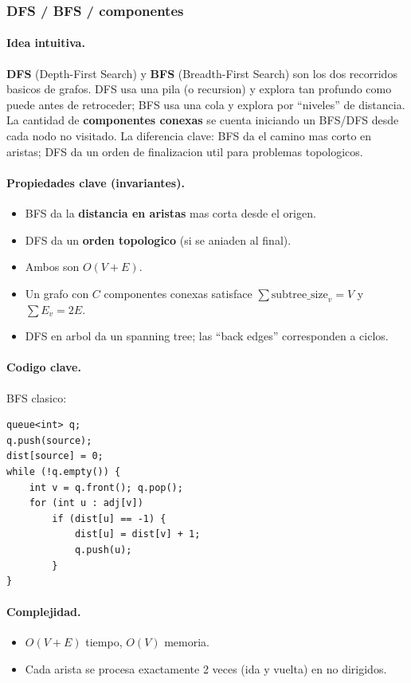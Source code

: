 ﻿\subsubsection{DFS / BFS / componentes}

\paragraph{Idea intuitiva.}
\textbf{DFS} (Depth-First Search) y \textbf{BFS} (Breadth-First Search) son los dos recorridos basicos de grafos. DFS usa una pila (o recursion) y explora tan profundo como puede antes de retroceder; BFS usa una cola y explora por ``niveles'' de distancia. La cantidad de \textbf{componentes conexas} se cuenta iniciando un BFS/DFS desde cada nodo no visitado. La diferencia clave: BFS da el camino mas corto en aristas; DFS da un orden de finalizacion util para problemas topologicos.

\paragraph{Propiedades clave (invariantes).}
\begin{itemize}\setlength\itemsep{0pt}
	\item BFS da la \textbf{distancia en aristas} mas corta desde el origen.
	\item DFS da un \textbf{orden topologico} (si se aniaden al final).
	\item Ambos son $O(V + E)$.
	\item Un grafo con $C$ componentes conexas satisface $\sum \text{subtree\_size}_v = V$ y $\sum E_v = 2E$.
	\item DFS en arbol da un spanning tree; las ``back edges'' corresponden a ciclos.
\end{itemize}

\paragraph{Codigo clave.}
BFS clasico:
\begin{verbatim}
queue<int> q;
q.push(source);
dist[source] = 0;
while (!q.empty()) {
    int v = q.front(); q.pop();
    for (int u : adj[v])
        if (dist[u] == -1) {
            dist[u] = dist[v] + 1;
            q.push(u);
        }
}
\end{verbatim}

\paragraph{Complejidad.}
\begin{itemize}\setlength\itemsep{0pt}
	\item $O(V + E)$ tiempo, $O(V)$ memoria.
	\item Cada arista se procesa exactamente 2 veces (ida y vuelta) en no dirigidos.
\end{itemize}

